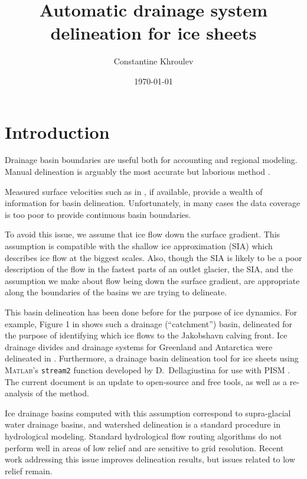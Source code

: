 \documentclass{amsart}
\begin{document}
\title{Automatic drainage system delineation for ice sheets}
\author{Constantine Khroulev}
\date{\today}
\maketitle

\section{Introduction}
\label{sec:introduction}
Drainage basin boundaries are useful both for accounting and regional modeling.
Manual delineation is arguably the most accurate but laborious method \cite{zwally2012}.

Measured surface velocities such as in \cite{joughin2010greenland}, if
available, provide a wealth of information for basin delineation.
Unfortunately, in many cases the data coverage is too poor to provide continuous
basin boundaries.

To avoid this issue, we assume that ice flow down the surface gradient.  This
assumption is compatible with the shallow ice approximation (SIA) which describes ice
flow at the biggest scales.  Also, though the SIA is likely to be a poor description
of the flow in the fastest parts of an outlet glacier, the SIA, and the assumption
we make about flow being down the surface gradient, are appropriate along the
boundaries of the basins we are trying to delineate.

This basin delineation has been done before for the purpose of ice dynamics.
For example, Figure 1 in \cite{Joughinetal2008JGR} shows such a drainage
(``catchment'') basin, delineated for the purpose of identifying which ice flows
to the Jakobshavn calving front.  Ice drainage  divides and drainage systems for
Greenland and Antarctica were delineated in \cite{ZwallyGiovinetto2001,zwally2012}.
Furthermore, a drainage basin delineation tool
for ice sheets using \textsc{Matlab}'s \texttt{stream2} function developed by
D.~Dellagiustina for use with PISM \cite{DellaGiustina2011}.  The current
document is an update to open-source and free tools, as well as a re-analysis
of the method.

Ice drainage basins computed with this assumption correspond to supra-glacial
water drainage basins, and watershed delineation is a standard procedure in
hydrological modeling. Standard hydrological flow routing algorithms
\cite{lea1992aspect,jenson1988extracting,costa1994digital} do not perform well
in areas of low relief and are sensitive to grid resolution. Recent work
addressing this issue
\cite{schwanghart2010topotoolbox,seibert2007new,liang2000general,tarboton1997new}
improves delineation results, but issues related to low relief remain.
\end{document}
